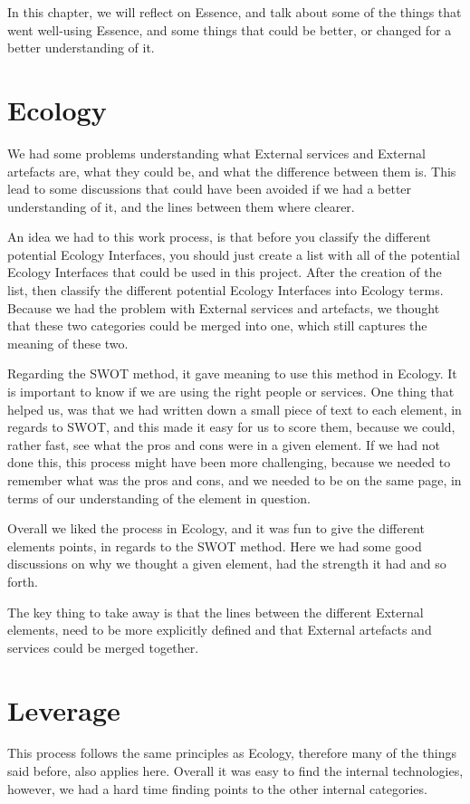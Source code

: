 In this chapter, we will reflect on Essence, and talk about some of the things that went well-using Essence, and some things that could be better, or changed for a better understanding of it.

\section{Ecology}
We had some problems understanding what External services and External artefacts are, what they could be, and what the difference between them is.
This lead to some discussions that could have been avoided if we had a better understanding of it, and the lines between them where clearer.

An idea we had to this work process, is that before you classify the different potential Ecology Interfaces, you should just create a list with all of the potential Ecology Interfaces that could be used in this project.
After the creation of the list, then classify the different potential Ecology Interfaces into Ecology terms.
Because we had the problem with External services and artefacts, we thought that these two categories could be merged into one, which still captures the meaning of these two.

Regarding the SWOT method, it gave meaning to use this method in Ecology. 
It is important to know if we are using the right people or services.
One thing that helped us, was that we had written down a small piece of text to each element, in regards to SWOT, and this made it easy for us to score them, because we could, rather fast, see what the pros and cons were in a given element.
If we had not done this, this process might have been more challenging, because we needed to remember what was the pros and cons, and we needed to be on the same page, in terms of our understanding of the element in question.

Overall we liked the process in Ecology, and it was fun to give the different elements points, in regards to the SWOT method. 
Here we had some good discussions on why we thought a given element, had the strength it had and so forth.

The key thing to take away is that the lines between the different External elements, need to be more explicitly defined and that External artefacts and services could be merged together.

\section{Leverage}
This process follows the same principles as Ecology, therefore many of the things said before, also applies here.
Overall it was easy to find the internal technologies, however, we had a hard time finding points to the other internal categories.

